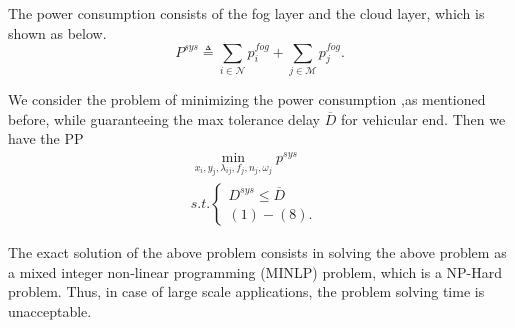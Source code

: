 \documentclass[twoside,twocolumn]{article}
\begin{document}
The power consumption consists of the fog layer and the cloud layer, which is shown as below.
$$
P^{sys} \triangleq \sum_{i \in \mathcal{N}} p_i^{fog} + \sum_{j \in \mathcal{M}} p_j^{fog}.
$$

We consider the problem of minimizing the power consumption ,as mentioned before, while guaranteeing the max tolerance delay $\overline{D}$ for vehicular end. Then we have the PP
\begin{equation*}
\begin{split}
%
\min_{x_i,y_j,\lambda_{ij},f_j,n_j,\omega_j} p^{sys}  \\  
s.t.\left\{
\begin{array}{lr}
D^{sys} \leq \overline{D} &  \\
(1)-(8). &
\end{array}
\right.
%	
\end{split}
\end{equation*}


The exact solution of the above problem consists in solving the above problem as  a mixed integer non-linear
programming (MINLP) problem, which is a NP-Hard problem. Thus, in case of large scale applications, the problem solving time is unacceptable.
\end{document}
